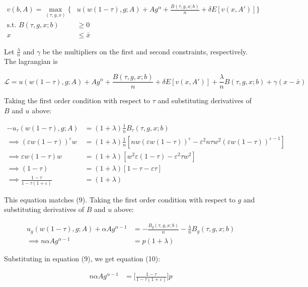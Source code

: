 \documentclass{article}
\newcommand{\Lfn}{\mathcal{L}}
\begin{document}
\begin{enumerate}
\begin{align*}
v(b, A) = \max_{(\tau, g, x)} \Bigg\{& u(w(1-\tau), g; A) + Ag^\alpha + \frac{B(\tau, g, x; b)}{n} + \delta E[v(x, A')] \Bigg\}\\
\text{s.t. } B(\tau, g, x; b) &\ge 0\\
x &\le \bar x
\end{align*}

Let $\frac{\lambda}{n}$ and $\gamma$ be the multipliers on the first and second constraints, respectively. The lagrangian is 

$$
\Lfn = u(w(1-\tau), g; A) + Ag^\alpha + \frac{B(\tau, g, x; b)}{n} + \delta E[v(x, A')] + \frac{\lambda}{n} B(\tau, g, x;b) + \gamma (x - \bar x) 
$$

Taking the first order condition with respect to $\tau$ and substituting derivatives of $B$ and $u$ above:

\begin{align*}
-u_\tau(w(1-\tau), g; A) &= (1 + \lambda) \frac{1}{n} B_\tau(\tau, g, x;b)   \\
\implies
(\varepsilon w(1-\tau))^\varepsilon w &= (1 + \lambda) \frac{1}{n} [n w(\varepsilon w(1-\tau))^\varepsilon - \varepsilon^2 n \tau w^2(\varepsilon w(1-\tau))^{\varepsilon-1}]  \\
\implies
\varepsilon w(1-\tau) w &= (1 + \lambda)  [w^2\varepsilon (1-\tau) - \varepsilon^2 \tau w^2]  \\
\implies
 (1-\tau)  &= (1 + \lambda)  [ 1-\tau - \varepsilon \tau ]  \\
\implies
\frac{1-\tau}{1- \tau (1+\varepsilon)  }  &= (1 + \lambda)
\end{align*}

This equation matches (9).  Taking the first order condition with respect to $g$ and substituting derivatives of $B$ and $u$ above:

\begin{align*}
u_g(w(1-\tau), g; A) + \alpha A g^{\alpha-1} &= - \frac{B_g(\tau, g, x; b)}{n}  - \frac{\lambda}{n} B_g(\tau, g, x;b)\\
\implies
n \alpha A g^{\alpha-1} &= p (1  + \lambda)
\end{align*}

Substituting in equation (9), we get equation (10):

\begin{align*}
n \alpha A g^{\alpha-1} &= \Bigg[\frac{1-\tau}{1- \tau (1+\varepsilon)  } \Bigg]p 
\end{align*}


\end{enumerate}
\end{document}
